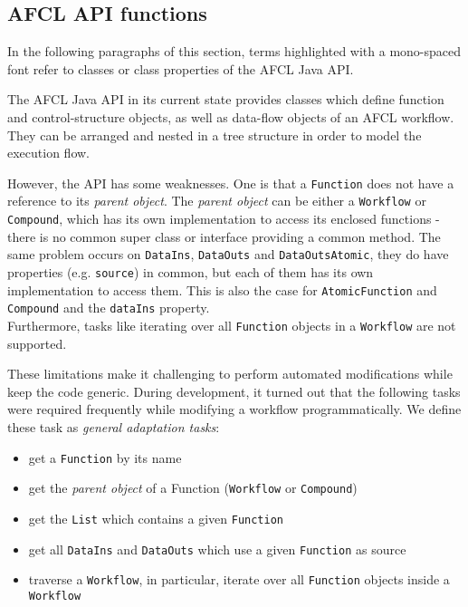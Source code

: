 \begin{appendix}


\chapter{AFCL API functions}
\label{apx:afcl-functions}

In the following paragraphs of this section, terms highlighted with a mono-spaced font refer to classes or class properties of the AFCL Java API.

The AFCL Java API in its current state provides classes which define function and control-structure objects, as well as data-flow objects of an AFCL workflow. They can be arranged and nested in a tree structure in order to model the execution flow.

However, the API has some weaknesses. One is that a \texttt{Function} does not have a reference to its \textit{parent object}. The \textit{parent object} can be either a \texttt{Workflow} or \texttt{Compound}, which has its own implementation to access its enclosed functions - there is no common super class or interface providing a common method. The same problem occurs on \texttt{DataIns}, \texttt{DataOuts} and \texttt{DataOutsAtomic}, they do have properties (e.g. \texttt{source}) in common, but each of them has its own implementation to access them. This is also the case for \texttt{AtomicFunction} and \texttt{Compound} and the \texttt{dataIns} property.\\
Furthermore, tasks like iterating over all \texttt{Function} objects in a \texttt{Workflow} are not supported. 

These limitations make it challenging to perform automated modifications while keep the code generic.
During development, it turned out that the following tasks were required frequently while modifying a workflow programmatically. We define these task  as \textit{general adaptation tasks}:
\begin{itemize}
	\item get a \texttt{Function} by its name
	\item get the \textit{parent object} of a Function (\texttt{Workflow} or \texttt{Compound})
	\item get the \texttt{List} which contains a given \texttt{Function}
	\item get all \texttt{DataIns} and \texttt{DataOuts} which use a given \texttt{Function} as source
	\item traverse a \texttt{Workflow}, in particular, iterate over all \texttt{Function} objects inside a \texttt{Workflow}
\end{itemize}


\end{appendix}
